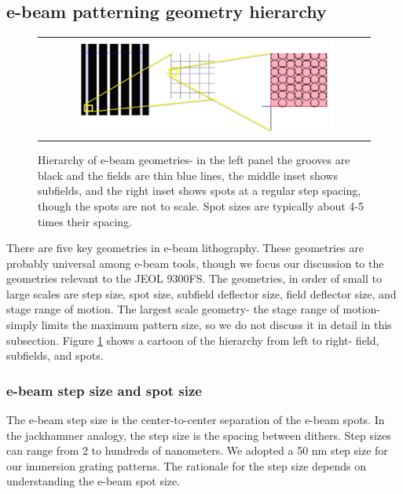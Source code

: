 \documentclass[]{spie}  %
\begin{document}
\subsection{e-beam patterning geometry hierarchy}

\begin{figure}
\begin{center}
 \begin{tabular}{c}
    \includegraphics[width=0.8\textwidth]{figs/Field_sizes_cascade_02.png}
   \end{tabular}
  \end{center}
  \caption[CA1a Efficiency]{\label{fig:Hierarchy} Hierarchy of e-beam geometries- in the left panel the grooves are black and the fields are thin blue lines, the middle inset shows subfields, and the right inset shows spots at a regular step spacing, though the spots are not to scale.  Spot sizes are typically about 4-5 times their spacing.}
\end{figure}


There are five key geometries in e-beam lithography.  These geometries are probably universal among e-beam tools, though we focus our discussion to the geometries relevant to the JEOL 9300FS.  The geometries, in order of small to large scales are step size, spot size, subfield deflector size, field deflector size, and stage range of motion.  The largest scale geometry- the stage range of motion- simply limits the maximum pattern size, so we do not discuss it in detail in this subsection.  Figure \ref{fig:Hierarchy} shows a cartoon of the hierarchy from left to right- field, subfields, and spots.

\subsubsection{e-beam step size and spot size}
The e-beam step size is the center-to-center separation of the e-beam spots.  In the jackhammer analogy, the step size is the spacing between dithers.  Step sizes can range from 2 to hundreds of nanometers.  We adopted a 50 nm step size for our immersion grating patterns.  The rationale for the step size depends on understanding the e-beam spot size.  
\end{document}
